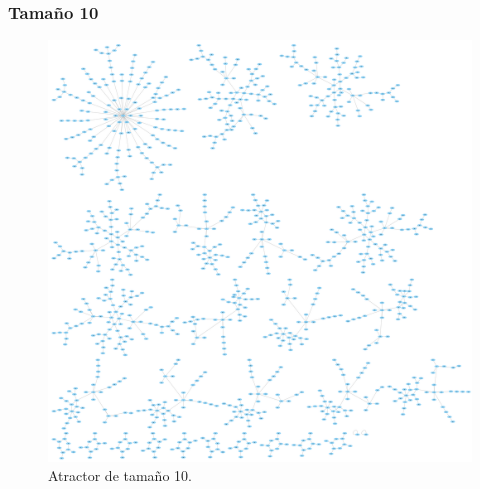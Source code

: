 \documentclass[11pt]{article}
\begin{document}
			\subsubsection{Tamaño 10}
			\begin{figure}[H]
			\centering
			\includegraphics[scale=0.1]{resources/Atractores22/atractor_22_size_10.png}
			\caption{Atractor de tamaño 10.}\label{fig:picture}
			\end{figure}
\end{document}
